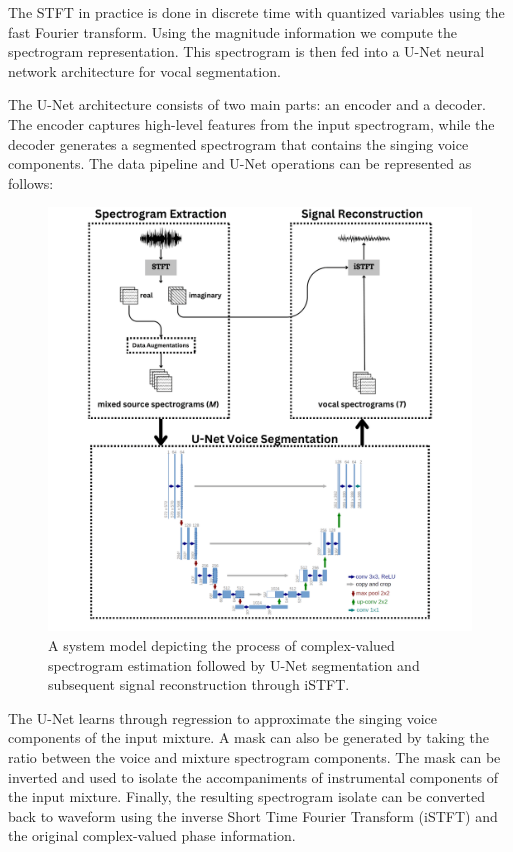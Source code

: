 \documentclass[conference]{IEEEtran}
\begin{document}
The STFT in practice is done in discrete time with quantized variables using the fast Fourier transform. Using the magnitude information we compute the spectrogram representation. This spectrogram is then fed into a U-Net neural network architecture for vocal segmentation.

The U-Net architecture consists of two main parts: an encoder and a decoder. The encoder captures high-level features from the input spectrogram, while the decoder generates a segmented spectrogram that contains the singing voice components. The data pipeline and U-Net operations can be represented as follows:

\begin{figure}[htbp]
\centering
\includegraphics[width=\linewidth]{system_model.png}
\caption{A system model depicting the process of complex-valued spectrogram estimation followed by U-Net \cite{ronneberger2015unet} segmentation and subsequent signal reconstruction through iSTFT.}
\label{fig:sysmodel}
\end{figure}


The U-Net learns through regression to approximate the singing voice components of the input mixture. A mask can also be generated by taking the ratio between the voice and mixture spectrogram components. The mask can be inverted and used to isolate the accompaniments of instrumental components of the input mixture. Finally, the resulting spectrogram isolate can be converted back to waveform using the inverse Short Time Fourier Transform (iSTFT) and the original complex-valued phase information.
\end{document}
